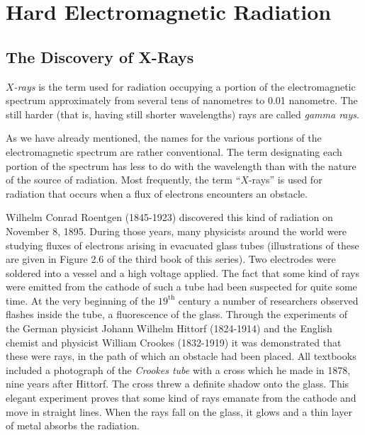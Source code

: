 

\cleardoublepage
\chapter{Hard Electromagnetic Radiation}
\label{ch-03}

\section{The Discovery of X-Rays}

\emph{$X$-rays} is the term used for radiation occupying a portion of the electromagnetic spectrum approximately from several tens of nanometres to 0.01 nanometre. The still harder (that is, having still shorter wavelengths) rays are called \emph{gamma rays}.

As we have already mentioned, the names for the various portions of the electromagnetic spectrum are rath­er conventional. The term designating each portion of the spectrum has less to do with the wavelength than with the nature of the source of radiation. Most frequent­ly, the term ``$X$-rays'' is used for radiation that occurs when a flux of electrons encounters an obstacle.

Wilhelm Conrad Roentgen (1845-1923) discovered this kind of radiation on November 8, 1895. During those years, many physicists around the world were studying fluxes of electrons arising in evacuated glass tubes (illus­trations of these are given in Figure 2.6 of the third book of this series). Two electrodes were soldered into a vessel and a high voltage applied. The fact that some kind of rays were emitted from the cathode of such a tube had been suspected for quite some time. At the very beginning of the $19^{\textrm{th}}$ century a number of researchers observed flashes inside the tube, a fluorescence of the glass. Through the experiments of the German physicist Johann Wilhelm Hittorf (1824-1914) and the English chemist and physicist William Crookes (1832-1919) it was demonstrated that these were rays, in the path of which an obstacle had been placed. All textbooks included a pho­tograph of the \emph{Crookes tube} with a cross which he made in 1878, nine years after Hittorf. The cross threw a definite shadow onto the glass. This elegant experiment proves that some kind of rays emanate from the cathode and move in straight lines. When the rays fall on the glass, it glows and a thin layer of metal absorbs the radiation.

